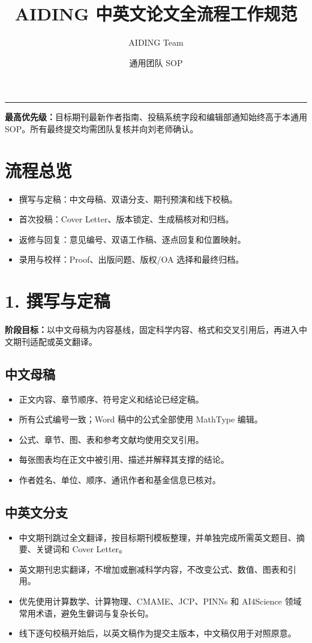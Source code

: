 \documentclass[UTF8,11pt]{ctexart}
\title{\textcolor{aidinggreen}{AIDING 中英文论文全流程工作规范}}
\author{AIDING Team}
\date{通用团队 SOP}
\newcommand{\sectionrule}{\par\noindent\textcolor{aidinggreen}{\rule{\linewidth}{0.7pt}}\par}
\begin{document}
\maketitle
\sectionrule
\textbf{最高优先级：}目标期刊最新作者指南、投稿系统字段和编辑部通知始终高于本通用 SOP。所有最终提交均需团队复核并向刘老师确认。
\section{流程总览}
\begin{itemize}
\item 撰写与定稿：中文母稿、双语分支、期刊预演和线下校稿。
\item 首次投稿：Cover Letter、版本锁定、生成稿核对和归档。
\item 返修与回复：意见编号、双语工作稿、逐点回复和位置映射。
\item 录用与校样：Proof、出版问题、版权/OA 选择和最终归档。
\end{itemize}
\section{1. 撰写与定稿}
\textbf{阶段目标：}以中文母稿为内容基线，固定科学内容、格式和交叉引用后，再进入中文期刊适配或英文翻译。
\subsection{中文母稿}
\begin{itemize}
\item 正文内容、章节顺序、符号定义和结论已经定稿。
\item 所有公式编号一致；Word 稿中的公式全部使用 MathType 编辑。
\item 公式、章节、图、表和参考文献均使用交叉引用。
\item 每张图表均在正文中被引用、描述并解释其支撑的结论。
\item 作者姓名、单位、顺序、通讯作者和基金信息已核对。
\end{itemize}
\subsection{中英文分支}
\begin{itemize}
\item 中文期刊跳过全文翻译，按目标期刊模板整理，并单独完成所需英文题目、摘要、关键词和 Cover Letter。
\item 英文期刊忠实翻译，不增加或删减科学内容，不改变公式、数值、图表和引用。
\item 优先使用计算数学、计算物理、CMAME、JCP、PINNs 和 AI4Science 领域常用术语，避免生僻词与复杂长句。
\item 线下逐句校稿开始后，以英文稿作为提交主版本，中文稿仅用于对照原意。
\end{itemize}
\end{document}
